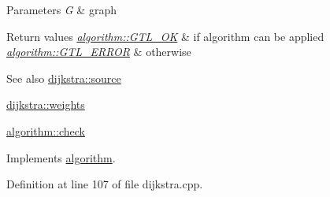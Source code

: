 \begin{DoxyParams}{Parameters}
{\em G} & graph\\
\hline
\end{DoxyParams}

\begin{DoxyRetVals}{Return values}
{\em \mbox{\hyperlink{classalgorithm_af1a0078e153aa99c24f9bdf0d97f6710a5114c20e4a96a76b5de9f28bf15e282b}{algorithm\+::\+G\+T\+L\+\_\+\+OK}}} & if algorithm can be applied \\
\hline
{\em \mbox{\hyperlink{classalgorithm_af1a0078e153aa99c24f9bdf0d97f6710a6fcf574690bbd6cf710837a169510dd7}{algorithm\+::\+G\+T\+L\+\_\+\+E\+R\+R\+OR}}} & otherwise\\
\hline
\end{DoxyRetVals}
\begin{DoxySeeAlso}{See also}
\mbox{\hyperlink{classdijkstra_a9689f2628f76ddb3747ea18c91bd7041}{dijkstra\+::source}} 

\mbox{\hyperlink{classdijkstra_a92f4394b757f6ffcb372535114a6cbf6}{dijkstra\+::weights}} 

\mbox{\hyperlink{classalgorithm_a76361fb03ad1cf643affc51821e43bed}{algorithm\+::check}} 
\end{DoxySeeAlso}


Implements \mbox{\hyperlink{classalgorithm_a76361fb03ad1cf643affc51821e43bed}{algorithm}}.



Definition at line 107 of file dijkstra.\+cpp.


